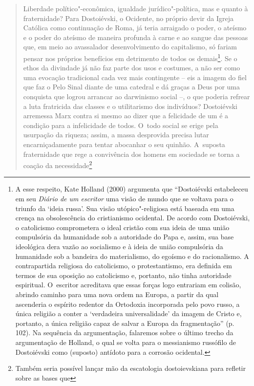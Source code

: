 {\begin{quote}
Liberdade político"-econômica, igualdade jurídico"-política, mas e quanto
à fraternidade? Para Dostoiévski, o Ocidente, no próprio devir da Igreja
Católica como continuação de Roma, já teria arraigado o poder, o ateísmo
e o poder do ateísmo de maneira profunda à carne e ao sangue das pessoas
que, em meio ao avassalador desenvolvimento do capitalismo, só fariam
pensar nos próprios benefícios em detrimento de todos os
demais\footnote{A esse respeito, Kate Holland (2000) argumenta que
  ``Dostoiévski estabeleceu em seu \emph{Diário de um escritor} uma
  visão de mundo que se voltava para o triunfo da `ideia russa'. Sua
  visão utópico"-religiosa está baseada em uma crença na obsolescência do
  cristianismo ocidental. De acordo com Dostoiévski, o catolicismo
  comprometera o ideal cristão com sua ideia de uma união compulsória da
  humanidade sob a autoridade do Papa e, assim, sua base ideológica dera
  vazão ao socialismo e à ideia de união compulsória da humanidade sob a
  bandeira do materialismo, do egoísmo e do racionalismo. A
  contrapartida religiosa do catolicismo, o protestantismo, era definida
  em termos de sua oposição ao catolicismo e, portanto, não tinha
  autoridade espiritual. O~escritor acreditava que essas forças logo
  entrariam em colisão, abrindo caminho para uma nova ordem na Europa, a
  partir da qual ascenderia o espírito redentor da Ortodoxia incorporada
  pelo povo russo, a única religião a conter a `verdadeira
  universalidade' da imagem de Cristo e, portanto, a única religião
  capaz de salvar a Europa da fragmentação'' (p. 102). Na sequência da
  argumentação, falaremos sobre o último trecho da argumentação de
  Holland, o qual se volta para o messianismo russófilo de Dostoiévski
  como (suposto) antídoto para a corrosão ocidental.}. Se o ethos da
divindade já não faz parte dos usos e costumes, a não ser como uma
evocação tradicional cada vez mais contingente -- eis a imagem do fiel
que faz o Pelo Sinal diante de uma catedral e dá graças a Deus por uma
conquista que logrou arrancar ao darwinismo social --, o que poderia
refrear a luta fratricida das classes e o utilitarismo dos indivíduos?
Dostoiévski arremessa Marx contra si mesmo ao dizer que a felicidade de
um é a condição para a infelicidade de todos. O~todo social se erige
pela usurpação da riqueza; assim, a massa desprovida precisa lutar
encarniçadamente para tentar abocanhar o seu quinhão. A~suposta
fraternidade que rege a convivência dos homens em sociedade se torna a
coação da necessidade\footnote{Também seria possível lançar mão da
  escatologia dostoievskiana para refletir sobre as bases que
}
\end{quote}}
